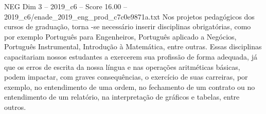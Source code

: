 \begin{textsample}{NEG Dim 3 – 2019\_c6 – Score 16.00 – 2019\_c6/enade\_2019\_eng\_prod\_c7c0e9871a.txt}
Nos projetos pedagógicos dos cursos de graduação, torna -se necessário inserir disciplinas obrigatórias, como por exemplo Português para Engenheiros, Português aplicado a Negócios, Português Instrumental, Introdução à Matemática, entre outras.
Essas disciplinas capacitariam nossos estudantes a exercerem sua profissão de forma adequada, já que os erros de escrita da nossa língua e nas operações aritméticas básicas, podem impactar, com graves consequências, o exercício de suas carreiras, por exemplo, no entendimento de uma ordem, no fechamento de um contrato ou no entendimento de um relatório, na interpretação de gráficos e tabelas, entre outros.

\end{textsample}
